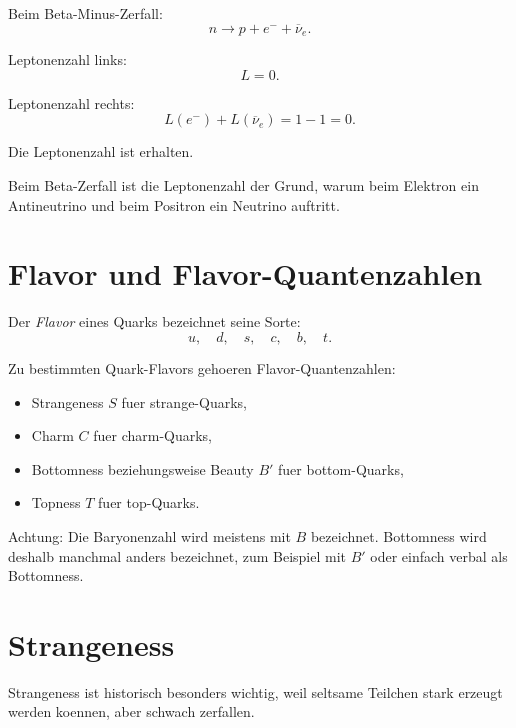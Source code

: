 \begin{examplebox}
Beim Beta-Minus-Zerfall:
\[
    n \rightarrow p + e^- + \overline{\nu}_e.
\]

Leptonenzahl links:
\[
    L=0.
\]

Leptonenzahl rechts:
\[
    L(e^-)+L(\overline{\nu}_e)
    =
    1-1
    =
    0.
\]

Die Leptonenzahl ist erhalten.
\end{examplebox}

\begin{examtipbox}
Beim Beta-Zerfall ist die Leptonenzahl der Grund, warum beim Elektron ein
Antineutrino und beim Positron ein Neutrino auftritt.
\end{examtipbox}

\section{Flavor und Flavor-Quantenzahlen}

\begin{definitionbox}
Der \emph{Flavor} eines Quarks bezeichnet seine Sorte:
\[
    u,\quad d,\quad s,\quad c,\quad b,\quad t.
\]
\end{definitionbox}

\begin{conceptbox}
Zu bestimmten Quark-Flavors gehoeren Flavor-Quantenzahlen:
\begin{itemize}
    \item Strangeness $S$ fuer strange-Quarks,
    \item Charm $C$ fuer charm-Quarks,
    \item Bottomness beziehungsweise Beauty $B'$ fuer bottom-Quarks,
    \item Topness $T$ fuer top-Quarks.
\end{itemize}
\end{conceptbox}

\begin{notebox}
Achtung:
Die Baryonenzahl wird meistens mit $B$ bezeichnet.
Bottomness wird deshalb manchmal anders bezeichnet, zum Beispiel mit $B'$ oder
einfach verbal als Bottomness.
\end{notebox}

\section{Strangeness}

Strangeness ist historisch besonders wichtig, weil seltsame Teilchen stark erzeugt
werden koennen, aber schwach zerfallen.


